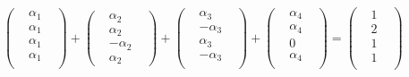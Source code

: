 \documentclass[45pt]{article}
\begin{document}
\begin{enumerate}
$\begin{pmatrix}
  &\alpha_1&\\&\alpha_1&\\ &\alpha_1&\\&\alpha_1&\\
\end{pmatrix} +
\begin{pmatrix}
  &\alpha_2&\\&\alpha_2&\\ &-\alpha_2&\\&\alpha_2&
\end{pmatrix}+
\begin{pmatrix}
  &\alpha_3&\\&-\alpha_3\\ &\alpha_3&\\&-\alpha_3&\\
\end{pmatrix}+
\begin{pmatrix}
  &\alpha_4&\\&\alpha_4&\\ &0&\\&\alpha_4&\\
\end{pmatrix} =\begin{pmatrix}
  &1&\\&2&\\ &1&\\&1&\\
\end{pmatrix}$\\\\



\end{enumerate}
\end{document}
